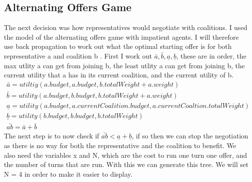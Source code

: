 \subsection{Alternating Offers Game}
The next decision was how representatives would negotiate with coalitions. I used the model of the alternating offers game with impatient agents. I will therefore use back propagation to work out what the optimal starting offer is for both representative a and coalition b . First I work out  $ \bar{a}, \bar{b}, \underline{a}, \underline{b} $, these are in order, the max utlity a can get from joining b, the least utlity a can get from joining b, the current utility that a has in its current coalition, and the current utility of b.
\begin{gather*}
\bar{a} = utiltiy(a.budget,a.budget,b.totalWeight +  a.weight) \\
\bar{b} = utility(a.budget,b.budget,b.totalWeight +  a.weight) \\
\underline{a} = utility(a.budget,a.currentCoalition.budget,a.currentCoaltion.totalWeight) \\
\underline{b} = utility(b.budget,b.budget,b.totalWeight) \\ 
\bar{ab} = \bar{a} + \bar{b} 
\end{gather*}
The next step is to now check if  $\bar{ab} < \underline{a} + \underline{b}$, if so then we can stop the negotiation as there is no way for both the representative and the coalition to benefit. We also need the variables x and N, which are the cost to run one turn one offer, and the number of turns that are run. With this we can generate this tree. We will set N = 4 in order to make it easier to display.
\\

